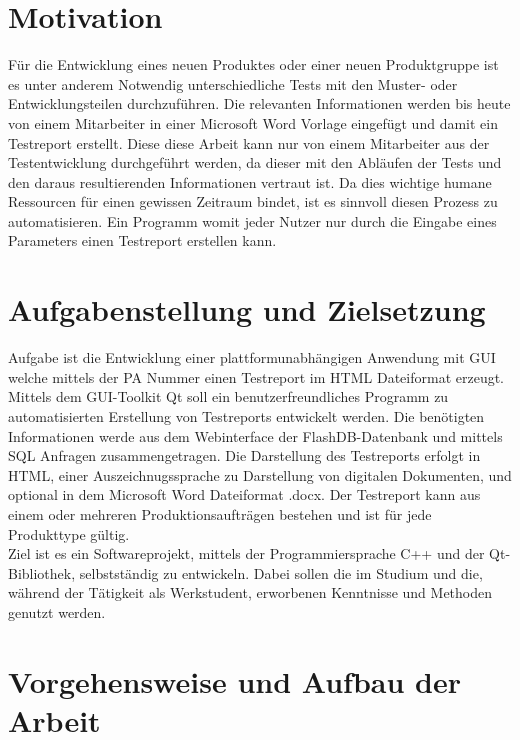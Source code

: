 	\vspace{5mm}
	
\section{Motivation}
	
	Für die Entwicklung eines neuen Produktes oder einer neuen Produktgruppe ist es unter anderem Notwendig unterschiedliche Tests mit den Muster- oder Entwicklungsteilen durchzuführen. Die relevanten Informationen werden bis heute von einem Mitarbeiter in einer Microsoft Word Vorlage eingefügt und damit ein Testreport erstellt. Diese diese Arbeit kann nur von einem Mitarbeiter aus der Testentwicklung durchgeführt werden, da dieser mit den Abläufen der Tests und den daraus resultierenden Informationen vertraut ist. Da dies wichtige humane Ressourcen für einen gewissen Zeitraum bindet, ist es sinnvoll diesen Prozess zu automatisieren. Ein Programm womit jeder Nutzer nur durch die Eingabe eines Parameters einen Testreport erstellen kann. 

	\vspace{5mm}
	
\section{Aufgabenstellung und Zielsetzung}

Aufgabe ist die Entwicklung einer plattformunabhängigen Anwendung mit \ac{GUI} welche mittels der \ac{PA} Nummer einen Testreport im \ac{HTML} Dateiformat erzeugt. Mittels dem GUI-Toolkit Qt soll ein benutzerfreundliches Programm zu automatisierten Erstellung von Testreports entwickelt werden. Die benötigten Informationen werde aus dem Webinterface der FlashDB-Datenbank und mittels \ac{SQL} Anfragen zusammengetragen. Die Darstellung des Testreports erfolgt in \ac{HTML}, einer Auszeichnugssprache zu Darstellung von digitalen Dokumenten, und optional in dem Microsoft Word Dateiformat .docx. Der Testreport kann aus einem oder mehreren Produktionsaufträgen bestehen und ist für jede Produkttype gültig. \\
Ziel ist es ein Softwareprojekt, mittels der Programmiersprache C++ und der Qt-Bibliothek, selbstständig zu entwickeln. Dabei sollen die im Studium und die, während der Tätigkeit als Werkstudent, erworbenen Kenntnisse und Methoden genutzt werden. 

	\vspace{5mm}
	
\section{Vorgehensweise und Aufbau der Arbeit}

